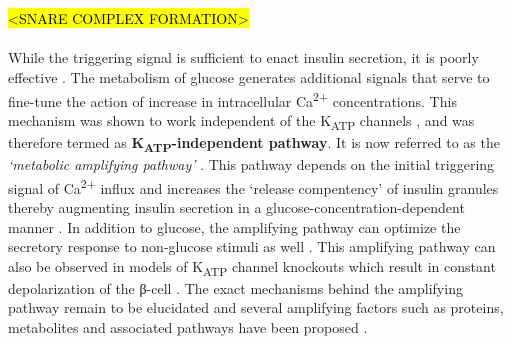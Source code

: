 \\\\
\hl{<SNARE COMPLEX FORMATION>}
\\\\
While the triggering signal is sufficient to enact insulin secretion, it is poorly effective \textbf{\cite{henquin_pathways_2004}}. The metabolism of glucose generates additional signals that serve to fine-tune the action of increase in intracellular Ca\textsuperscript{2+} concentrations. This mechanism was shown to work independent of the K\textsubscript{ATP} channels \textbf{\cite{sato_dual_1992,gembal_evidence_1992}}, and was therefore termed as \textbf{K\textsubscript{ATP}-independent pathway}. It is now referred to as the \textit{`metabolic amplifying pathway'} \textbf{\cite{henquin_triggering_2000,henquin_pathways_2004,henquin_regulation_2009}}.  This pathway depends on the initial triggering signal of Ca\textsuperscript{2+} influx and increases the `release compentency' of insulin granules thereby augmenting insulin secretion in a glucose-concentration-dependent manner \textbf{\cite{henquin_triggering_2000,kalwat_mechanisms_2017}}. In addition to glucose, the amplifying pathway can optimize the secretory response to non-glucose stimuli as well \textbf{\cite{henquin_triggering_2000,kalwat_mechanisms_2017,zhao_-hydrolase_2015,tengholm_camp_2017,han_glutamate_2021}}. This amplifying pathway can also be observed in models of K\textsubscript{ATP} channel knockouts which result in constant depolarization of the β-cell \textbf{\cite{nenquin_both_2004,miki_defective_1998,ravier_glucose_2009}}. The exact mechanisms behind the amplifying pathway remain to be elucidated and several amplifying factors such as proteins, metabolites and associated pathways have been proposed \textbf{\cite{kalwat_mechanisms_2017}}.
\\\\
